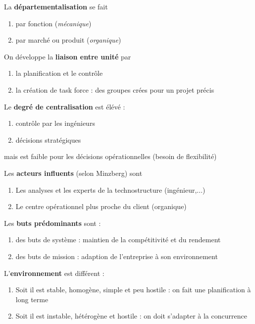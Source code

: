 \documentclass[12pt]{article}
\begin{document}
	La \textbf{départementalisation} se fait
	\begin{enumerate}
	 \item par fonction (\emph{mécanique})
	 \item par marché ou produit (\emph{organique})
	\end{enumerate}
	
	On développe la \textbf{liaison entre unité} par
	\begin{enumerate}
	 \item la planification et le contrôle
	 \item la création de \og{} task force\fg{} : des groupes crées pour un projet précis
	\end{enumerate}
	
	Le \textbf{degré de centralisation} est élévé :
	\begin{enumerate}
	 \item contrôle par les ingénieurs
	 \item décisions stratégiques
	\end{enumerate}
	mais est faible pour les décisions opérationnelles (besoin de flexibilité)
	
	Les \textbf{acteurs influents} (selon Minzberg) sont
	\begin{enumerate}
	 \item Les analyses et les experts de la technostructure (ingénieur,...)
	 \item Le centre opérationnel plus proche du client (organique)
	\end{enumerate}
	
	Les \textbf{buts prédominants} sont :
	\begin{enumerate}
	 \item des buts de système : maintien de la compétitivité et du rendement
	 \item des buts de mission : adaption de l'entreprise à son environnement
	\end{enumerate}
	
	L'\textbf{environnement} est différent :
	\begin{enumerate}
	 \item Soit il est stable, homogène, simple et peu hostile : on fait une planification à long terme
	 \item Soit il est instable, hétérogène et hostile : on doit s'adapter à la concurrence
	\end{enumerate}

	
\end{document}
